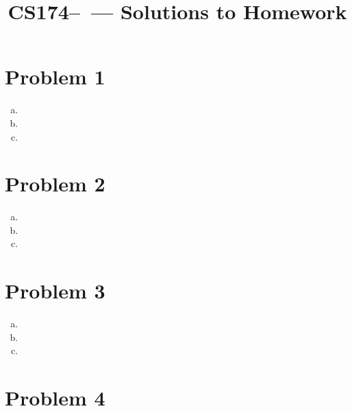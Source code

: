 \documentclass[11pt]{article}
\title{CS174--\Session\  --- Solutions to Homework \Homework}
\author{\Name}
\begin{document}
\maketitle
{}
\setcounter{problemnumber}{0}

\section*{Problem 1}
\begin{enumerate}[(a)]
\item 
\item 
\item 
\end{enumerate}


\newpage
\section*{Problem 2}
\begin{enumerate}[(a)]
\item 
\item 
\item 
\end{enumerate}


\newpage
\section*{Problem 3}
\begin{enumerate}[(a)]
\item 
\item 
\item 
\end{enumerate}


\newpage
\section*{Problem 4}
\end{document}
